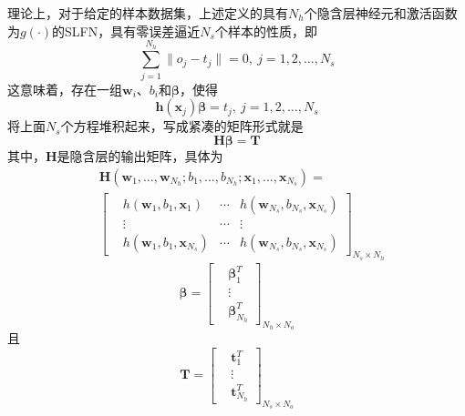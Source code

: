 理论上，对于给定的样本数据集，上述定义的具有$N_{h}$个隐含层神经元和激活函数为$g(\cdot)$的SLFN，具有零误差逼近$N_{s}$个样本的性质，即
\begin{equation}
\sum_{j=1}^{N_{h}}\|o_{j}-t_{j}\|=0,\ j=1,2,\dots,N_{s}
\end{equation}
这意味着，存在一组$\bm{w}_{i}$、$b_{i}$和$\bm{\beta}$，使得
\begin{equation}
\bm{h}(\bm{x}_{j})\bm{\beta}=t_{j},\ j=1,2,\dots,N_{s}
\end{equation}
将上面$N_{s}$个方程堆积起来，写成紧凑的矩阵形式就是
\begin{equation}\label{eq:4.ht}
\bm{H}\bm{\beta}=\bm{T} 
\end{equation}
其中，$\bm{H}$是隐含层的输出矩阵，具体为
\begin{equation}\label{eq.4.HT}
\begin{split}
&\bm{H}(\bm{w}_{1},\dots,\bm{w}_{N_{h}};b_{1},\dots,b_{N_{h}};\bm{x}_{1},\dots,\bm{x}_{N_{s}})=\\
&\begin{bmatrix}
&h(\bm{w}_{1},b_{1},\bm{x}_{1}) &\cdots &h(\bm{w}_{N_{s}},b_{N_{s}},\bm{x}_{N_{s}})\\
&\vdots &\cdots & \vdots\\
&h(\bm{w}_{1},b_{1},\bm{x}_{N_{s}}) &\cdots &h(\bm{w}_{N_{s}},b_{N_{s}},\bm{x}_{N_{s}})
\end{bmatrix}_{N_{s}\times N_{h}}
\end{split}
\end{equation}
\begin{equation}\label{eq:4.beta}
\bm{\beta} = \begin{bmatrix}%
&\bm{\beta}_{1}^{T}\\
&\vdots\\
&\bm{\beta}_{N_{h}}^{T}
\end{bmatrix}_{N_{h}\times N_{o}}
\end{equation}
且
\begin{equation}\label{eq:4.beta}
\bm{T} = \begin{bmatrix}%
&\bm{t}_{1}^{T}\\
&\vdots\\
&\bm{t}_{N_{h}}^{T}
\end{bmatrix}_{N_{s}\times N_{o}}
\end{equation}

